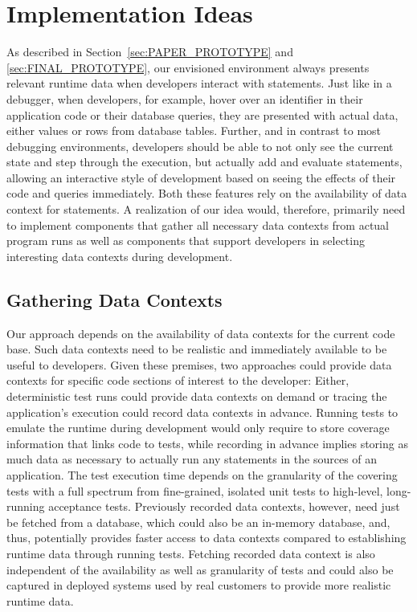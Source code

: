 \section{Implementation Ideas} \label{sec:IMPLEMENTATION_IDEAS}
As described in Section~\ref{sec:PAPER_PROTOTYPE} and \ref{sec:FINAL_PROTOTYPE}, our envisioned environment always presents relevant runtime data when developers interact with statements.
Just like in a debugger, when developers, for example, hover over an identifier in their application code or their database queries, they are presented with actual data, either values or rows from database tables.
Further, and in contrast to most debugging environments, developers should be able to not only see the current state and step through the execution, but actually add and evaluate statements, allowing an interactive style of development based on seeing the effects of their code and queries immediately.
Both these features rely on the availability of data context for statements.
A realization of our idea would, therefore, primarily need to implement components that gather all necessary data contexts from actual program runs as well as components that support developers in selecting interesting data contexts during development.

\subsection{Gathering Data Contexts}

Our approach depends on the availability of data contexts for the current code base.
Such data contexts need to be realistic and immediately available to be useful to developers.
Given these premises, two approaches could provide data contexts for specific code sections of interest to the developer:
Either, deterministic test runs could provide data contexts on demand or tracing the application's execution could record data contexts in advance.
Running tests to emulate the runtime during development would only require to store coverage information that links code to tests, while recording in advance implies storing as much data as necessary to actually run any statements in the sources of an application.
The test execution time depends on the granularity of the covering tests with a full spectrum from fine-grained, isolated unit tests to high-level, long-running acceptance tests.
Previously recorded data contexts, however, need just be fetched from a database, which could also be an in-memory database, and, thus, potentially provides faster access to data contexts compared to establishing runtime data through running tests.
Fetching recorded data context is also independent of the availability as well as granularity of tests and could also be captured in deployed systems used by real customers to provide more realistic runtime data.

